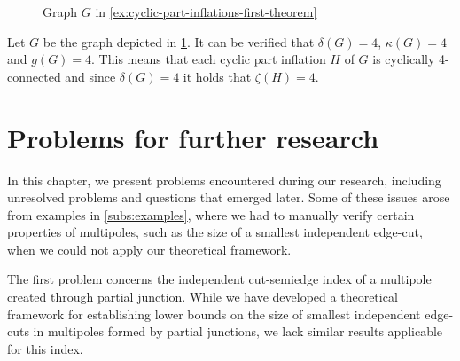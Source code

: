 \documentclass[12pt, twoside]{book}
\begin{document}
\begin{example}\label{ex:cyclic-part-inflations-first-theorem}
	\begin{figure}
		\centering
		\caption{Graph $G$ in \cref{ex:cyclic-part-inflations-first-theorem}}
		\label{fig:cyclic-part-inflations-ex-2-before}
	\end{figure}

	Let $G$ be the graph depicted in \cref{fig:cyclic-part-inflations-ex-2-before}. It can be verified that $\delta(G)=4$, $\kappa(G)=4$ and $g(G)=4$. This means that each cyclic part inflation $H$ of $G$ is cyclically 4-connected and since $\delta(G)=4$ it holds that $\zeta(H)=4$.
\end{example}


\chapter{Problems for further research}\label{ch:problems-for-research}

In this chapter, we present problems encountered during our research, including unresolved problems and questions that emerged later. Some of these issues arose from examples in \cref{subs:examples}, where we had to manually verify certain properties of multipoles, such as the size of a smallest independent edge-cut, when we could not apply our theoretical framework.

The first problem concerns the independent cut-semiedge index of a multipole created through partial junction. While we have developed a theoretical framework for establishing lower bounds on the size of smallest independent edge-cuts in multipoles formed by partial junctions, we lack similar results applicable for this index.
\end{document}
